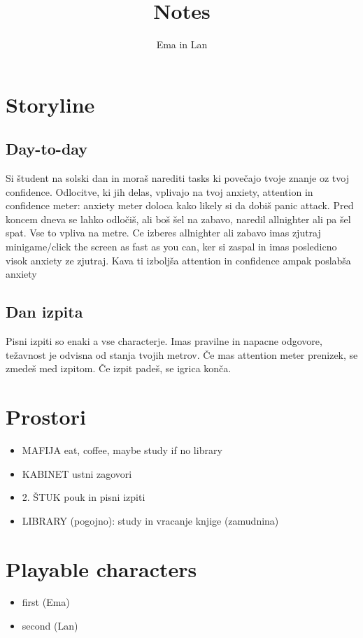 \documentclass[a4paper]{article}
\begin{document}
\title{Notes}
\author{Ema in Lan}
\date{}
\maketitle

\section{Storyline}
\subsection*{Day-to-day}
Si študent na solski dan in moraš narediti tasks ki povečajo tvoje znanje oz tvoj confidence.
Odlocitve, ki jih delas, vplivajo na tvoj anxiety, attention in confidence meter: anxiety meter doloca kako likely si da dobiš panic attack. Pred koncem dneva se lahko odločiš, ali boš šel na zabavo, naredil allnighter ali pa šel spat. Vse to vpliva na metre. Ce izberes allnighter ali zabavo imas zjutraj minigame/click the screen as fast as you can, ker si zaspal in imas posledicno visok anxiety ze zjutraj. Kava ti izboljša attention in confidence ampak poslabša anxiety

\subsection*{Dan izpita}
Pisni izpiti so enaki a vse characterje. Imas pravilne in napacne odgovore, težavnost je odvisna od stanja tvojih metrov.
Če mas attention meter prenizek, se zmedeš med izpitom.
Če izpit padeš, se igrica konča.

\section{Prostori}
\begin{itemize}
    \item MAFIJA\: eat, coffee, maybe study if no library
    \item KABINET\: ustni zagovori
    \item 2. ŠTUK\: pouk in pisni izpiti
    \item LIBRARY (pogojno): study in vracanje knjige (zamudnina)
\end{itemize}

\section{Playable characters}
\begin{itemize}
    \item first (Ema)
    \item second (Lan)
\end{itemize}
\end{document}
